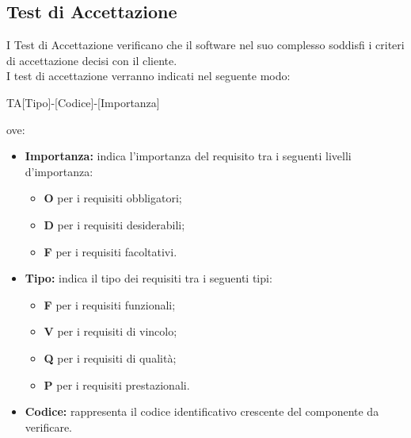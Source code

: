 \subsection{Test di Accettazione}
I Test di Accettazione verificano che il software nel suo complesso soddisfi i criteri di accettazione decisi con il cliente.\\I test di accettazione verranno indicati nel seguente modo:\\
\begin{center}
	TA[Tipo]-[Codice]-[Importanza]\\
\end{center}
ove:
\begin{itemize}
	\item \textbf{Importanza:} indica l'importanza del requisito tra i seguenti livelli d'importanza:
		\begin{itemize}
			\item \textbf{O} per i requisiti obbligatori;
			\item \textbf{D} per i requisiti desiderabili;
			\item \textbf{F} per i requisiti facoltativi.
		\end{itemize}
	\item \textbf{Tipo:} indica il tipo dei requisiti tra i seguenti tipi:
		\begin{itemize}
			\item \textbf{F} per i requisiti funzionali;
			\item \textbf{V} per i requisiti di vincolo;
			\item \textbf{Q} per i requisiti di qualità;
			\item \textbf{P} per i requisiti prestazionali.
		\end{itemize}
	\item \textbf{Codice:} rappresenta il codice identificativo crescente del componente da verificare.
\end{itemize}

